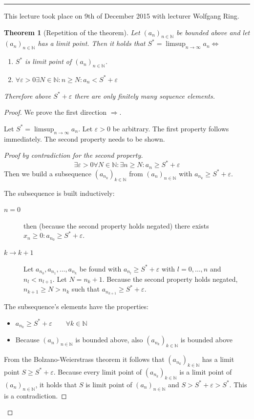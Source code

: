 \documentclass[a4paper,landscape,twocolumn]{article}
\newtheorem{theorem}{Theorem}
\newcommand\seq[1]{{\left(#1\right)}_{n \in \mathbb N}}
\newcommand\meta[3]{\hrule{} This #1 took place on #2 with lecturer #3.\par}
\begin{document}
\meta{lecture}{9th of December 2015}{Wolfgang Ring}
\begin{theorem}[Repetition of the theorem]
  Let $\seq{a_n}$ be bounded above and let $\seq{a_n}$ has a limit point.
  Then it holds that $S^* = \limsup_{n\to\infty} a_n \Leftrightarrow$
  \begin{enumerate}
    \item $S^*$ is limit point of $\seq{a_n}$.
    \item $\forall \varepsilon > 0 \exists N \in \mathbb N: n \geq N: a_n < S^* + \varepsilon$
  \end{enumerate}
  Therefore above $S^* + \varepsilon$ there are only finitely many sequence elements.
\end{theorem}
\begin{proof}
  We prove the first direction $\Rightarrow$.

  Let $S^* = \limsup_{n\to\infty} a_n$. Let $\varepsilon > 0$ be arbitrary.
  The first property follows immediately.
  The second property needs to be shown.

  \begin{proof}[Proof by contradiction for the second property]
    \[ \exists \varepsilon > 0 \forall N \in \mathbb N: \exists n \geq N: a_n \geq S^* + \varepsilon \]
    Then we build a subsequence $\left(a_{n_k}\right)_{k\in\mathbb N}$ from $\seq{a_n}$ with $a_{n_k} \geq S^* + \varepsilon$.

    The subsequence is built inductively:
    \begin{description}
      \item[$n = 0$]
        then (because the second property holds negated) there exists $x_n \geq 0: a_{n_0} \geq S^* + \varepsilon$.
      \item[$k \to k+1$]
        Let $a_{n_0}, a_{n_1}, \dots, a_{n_k}$ be found with $a_{n_l} \geq S^* + \varepsilon$ with $l = 0, \dots, n$
        and $n_l < n_{l+1}$. Let $N = n_k + 1$. Because the second property holds negated, $n_{k+1} \geq N > n_k$
        such that $a_{n_{k+1}} \geq S^* + \varepsilon$.
    \end{description}

    The subsequence's elements have the properties:
    \begin{itemize}
      \item $a_{n_k} \geq S^* + \varepsilon \qquad \forall k \in \mathbb N$
      \item Because $\seq{a_n}$ is bounded above, also $\left(a_{n_k}\right)_{k\in\mathbb N}$ is bounded above
    \end{itemize}
    From the Bolzano-Weierstrass theorem it follows that $\left(a_{n_k}\right)_{k\in\mathbb N}$ has a limit point
    $S \geq S^* + \varepsilon$. Because every limit point of $\left(a_{n_k}\right)_{k\in\mathbb N}$ is a limit point
    of $\seq{a_n}$, it holds that $S$ is limit point of $\seq{a_n}$ and $S > S^* + \varepsilon > S^*$.
    This is a contradiction.
  \end{proof}


\end{proof}
\end{document}
